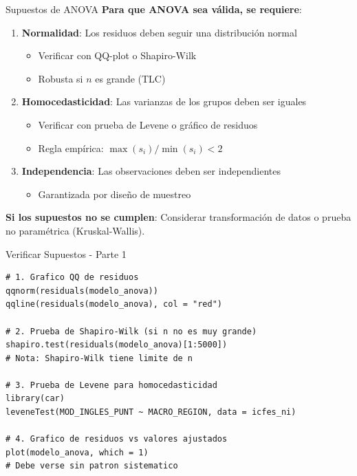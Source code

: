 \documentclass[aspectratio=169, 11pt]{beamer}
\begin{document}
\begin{frame}{Supuestos de ANOVA}
\textbf{Para que ANOVA sea válida, se requiere}:

\vspace{0.3cm}
\begin{enumerate}
  \item \textbf{Normalidad}: Los residuos deben seguir una distribución normal
  \begin{itemize}
    \item Verificar con QQ-plot o Shapiro-Wilk
    \item Robusta si $n$ es grande (TLC)
  \end{itemize}

  \item \textbf{Homocedasticidad}: Las varianzas de los grupos deben ser iguales
  \begin{itemize}
    \item Verificar con prueba de Levene o gráfico de residuos
    \item Regla empírica: $\max(s_i) / \min(s_i) < 2$
  \end{itemize}

  \item \textbf{Independencia}: Las observaciones deben ser independientes
  \begin{itemize}
    \item Garantizada por diseño de muestreo
  \end{itemize}
\end{enumerate}

\vspace{0.3cm}
\textbf{Si los supuestos no se cumplen}: Considerar transformación de datos o prueba no paramétrica (Kruskal-Wallis).
\end{frame}

\begin{frame}[fragile]{Verificar Supuestos - Parte 1}
\begin{lstlisting}
# 1. Grafico QQ de residuos
qqnorm(residuals(modelo_anova))
qqline(residuals(modelo_anova), col = "red")

# 2. Prueba de Shapiro-Wilk (si n no es muy grande)
shapiro.test(residuals(modelo_anova)[1:5000])
# Nota: Shapiro-Wilk tiene limite de n

# 3. Prueba de Levene para homocedasticidad
library(car)
leveneTest(MOD_INGLES_PUNT ~ MACRO_REGION, data = icfes_ni)

# 4. Grafico de residuos vs valores ajustados
plot(modelo_anova, which = 1)
# Debe verse sin patron sistematico
\end{lstlisting}
\end{frame}
\end{document}
